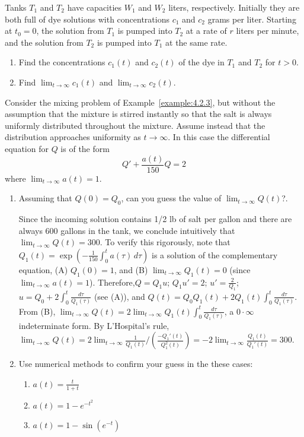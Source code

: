 \documentclass{ximera}
\begin{document}
\begin{problem}\label{exer:4.2.21}
Tanks $T_1$  and $T_2$ have capacities $W_1$ and $W_2$ liters,
respectively.
Initially they are both full of dye solutions with concentrations $c_{1}$
and $c_2$ grams per liter. Starting at $t_0=0$,  the solution from $T_1$
is pumped into $T_2$ at a rate of $r$  liters per minute,
and the solution from $T_2$
is pumped into $T_1$ at the same rate.

\begin{enumerate}
\item %
Find the concentrations $c_1(t)$ and $c_2(t)$ of the dye in $T_1$
and $T_2$ for $t>0$.
\item %
Find $\lim_{t\to\infty}c_1(t)$  and $\lim_{t\to\infty}c_2(t)$.
\end{enumerate}
\end{problem}

\begin{problem}\label{exer:4.2.22}  
Consider the mixing problem of Example~\ref{example:4.2.3}, but without
the assumption that the mixture is stirred instantly so that the salt
is always uniformly distributed throughout the mixture. Assume instead
that the distribution approaches uniformity as $t\to\infty$.
In this case the differential equation for $Q$ is  of the form
$$
Q'+\frac{a(t)}{150}Q=2
$$
where  $\lim_{t\to\infty}a(t)=1$.

\begin{enumerate}
\item %
Assuming that
$Q(0)=Q_0$, can you guess the value of
$\lim_{t\to\infty}Q(t)$?.

\begin{solution}
Since the incoming solution contains 1/2 lb of salt per gallon and there are always 600 gallons in the tank, we conclude
intuitively that $\lim_{t\to\infty}Q(t)=300$.
To verify this rigorously,
note that $Q_1(t)=\exp\left(-\frac{1}{150}\int_0^t
a(\tau)\,d\tau\right)$ is a solution of the complementary equation,
(A) $Q_1(0)=1$, and (B) $\lim_{t\to\infty}Q_1(t)=0$ (since
$\lim_{t\to\infty}a(t)=1$).  Therefore,$Q=Q_1u$; $Q_1u'=2$;
$u'=\frac{2}{Q_1}$;
$u=Q_0+2\int_0^t\frac{d\tau}{Q_1(\tau)}$ (see (A)), and
$Q(t)=Q_0Q_1(t)+2Q_1(t)\int_0^t\frac{d\tau}{Q_1(\tau)}$.
From (B),
$\lim_{t\to\infty}Q(t)=2\lim_{t\to\infty}Q_1(t)
\int_0^t\frac{d\tau}{Q_1(\tau)}$, a $0\cdot\infty$ indeterminate
form. By L'Hospital's rule,
$\lim_{t\to\infty}Q(t)=2\lim_{t\to\infty}
\frac{1}{Q_1(t)}\bigg/\left(\frac{-Q_1'(t)}{Q_1^2(t)}\right)
=-2\lim_{t\to\infty}\frac{Q_1(t)}{Q_1'(t)}=300$.
\end{solution}

\item %
Use numerical methods to  confirm  your guess in the these cases:
\begin{enumerate}
    \item $a(t)=\frac{t}{1+t}$
    \item $a(t)=1-e^{-t^2}$
    \item $a(t)=1-\sin(e^{-t})$
\end{enumerate}

\end{enumerate}
\end{problem}
\end{document}
